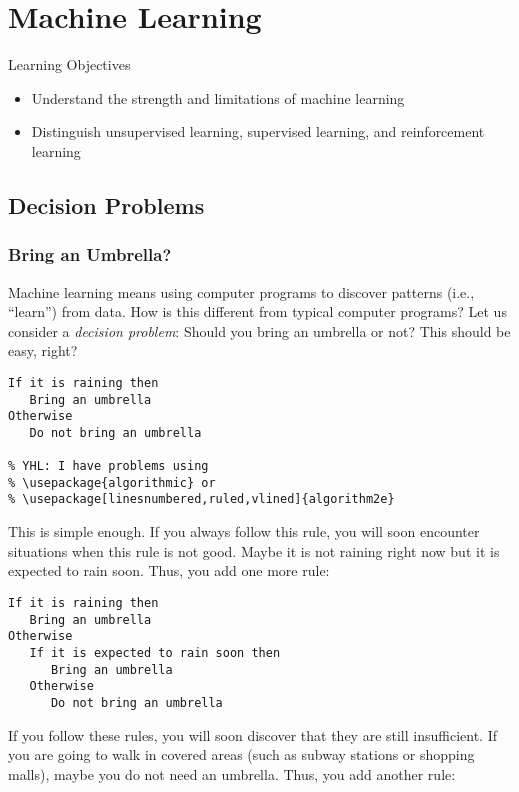 \chapter{Machine Learning}



Learning Objectives


\begin{itemize}
\item Understand the strength and limitations of machine learning
\item Distinguish  unsupervised learning,  supervised learning, and reinforcement learning
\end{itemize}

\section{Decision Problems}



\subsection{Bring an Umbrella?}



Machine learning means using computer programs to discover patterns
(i.e., ``learn'') from data. How is this different from typical
computer programs?  Let us consider a {\it decision problem}:
Should you bring an umbrella or not?  This should be easy, right?


\begin{verbatim}
If it is raining then
   Bring an umbrella
Otherwise
   Do not bring an umbrella

% YHL: I have problems using 
% \usepackage{algorithmic} or
% \usepackage[linesnumbered,ruled,vlined]{algorithm2e}
\end{verbatim}

This is simple enough.  If you always follow this rule, you will soon
encounter situations when this rule is not good.  Maybe it is not raining
right now but it is expected to rain soon. Thus, you add one more rule:

\begin{verbatim}
If it is raining then
   Bring an umbrella
Otherwise
   If it is expected to rain soon then
      Bring an umbrella
   Otherwise
      Do not bring an umbrella
\end{verbatim}



If you follow these rules, you will soon discover that they are still
insufficient.  If you are going to walk in covered areas (such as
subway stations or shopping malls), maybe you do not need an umbrella.
Thus, you add another rule:

